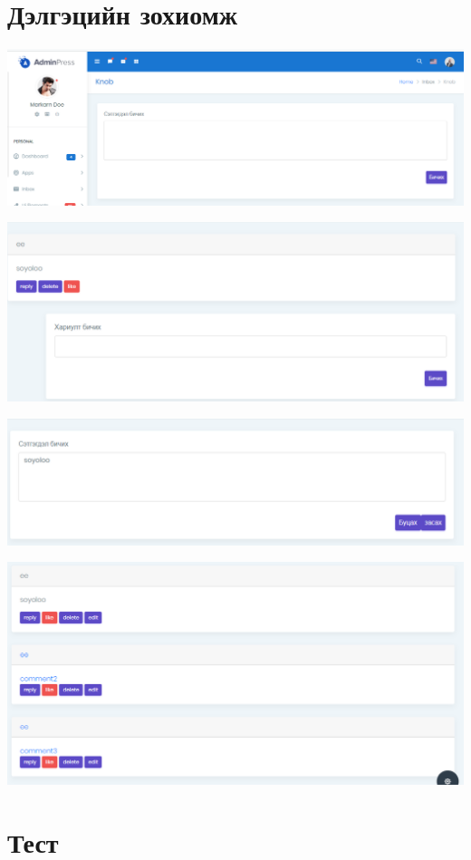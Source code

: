 \documentclass[12pt]{article}
\begin{document}
	\section{Дэлгэцийн зохиомж}
	\includegraphics[scale=0.5]{comment1}
	
	\includegraphics[scale=0.5]{comment3}
	
	\includegraphics[scale=0.5]{comment4}
	
	\includegraphics[scale=0.5]{comment5}
		\section{Тест}
	
\end{document}

